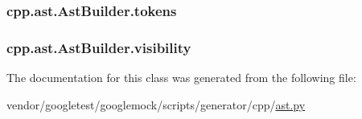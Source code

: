 \subsubsection[{\texorpdfstring{tokens}{tokens}}]{\setlength{\rightskip}{0pt plus 5cm}cpp.\+ast.\+Ast\+Builder.\+tokens}\hypertarget{classcpp_1_1ast_1_1AstBuilder_a1b21f8bef712e91862ccb6b1147cab0d}{}\label{classcpp_1_1ast_1_1AstBuilder_a1b21f8bef712e91862ccb6b1147cab0d}
\subsubsection[{\texorpdfstring{visibility}{visibility}}]{\setlength{\rightskip}{0pt plus 5cm}cpp.\+ast.\+Ast\+Builder.\+visibility}\hypertarget{classcpp_1_1ast_1_1AstBuilder_a2f16b19846c405101235432d2666b614}{}\label{classcpp_1_1ast_1_1AstBuilder_a2f16b19846c405101235432d2666b614}


The documentation for this class was generated from the following file\+:\begin{DoxyCompactItemize}
\item 
vendor/googletest/googlemock/scripts/generator/cpp/\hyperlink{ast_8py}{ast.\+py}\end{DoxyCompactItemize}
